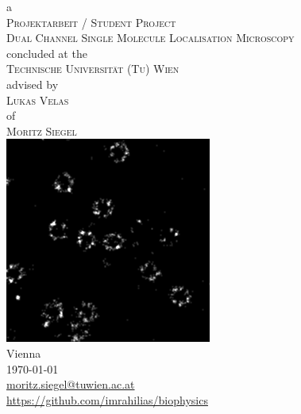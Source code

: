 \documentclass[11pt, a4paper, oneside, twocolumn]{report}
\begin{document}
\begin{titlepage}
  \onecolumn
  \centering
  \large
  a\\
  \vspace{.5cm}
  {\Large \textsc{ Projektarbeit / Student Project}}\\
  \vspace{1cm}
  {\Huge \textsc{ Dual Channel Single Molecule Localisation Microscopy}}\\
  \vspace{1cm}
  concluded at the\\
  \vspace{.5cm}
  {\Large \textsc{Technische Universit\"at (Tu) Wien}}\\
  \vspace{.5cm}
  advised by\\
  \vspace{.5cm}
  {\Large \textsc{Lukas Velas}}\\
  \vspace{.5cm}
  of\\
  \vspace{.5cm}
  {\Large \textsc{Moritz Siegel}}\\
  \vfill
  \includegraphics[scale=.5]{npc/npc256.png}\\
  \vfill
  Vienna\\
  \today\\
  \vspace{.5cm}
  \small{\href{mailto:moritz.siegel@tuwien.ac.at}{moritz.siegel@tuwien.ac.at}}\\
  \small{\url{https://github.com/imrahilias/biophysics}}\\
\end{titlepage}
\end{document}
